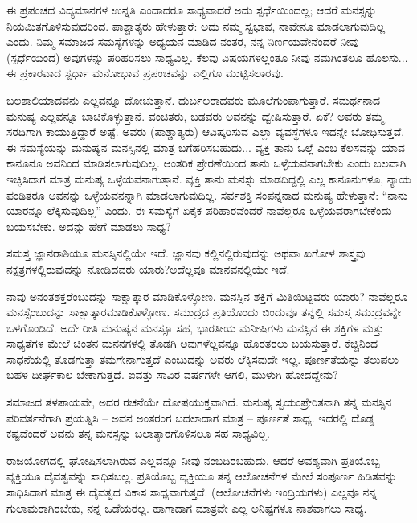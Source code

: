 \newpage

ಈ ಪ್ರಪಂಚದ ವಿದ್ಯಮಾನಗಳ ಉನ್ನತಿ ಎಂದಾದರೂ ಸಾಧ್ಯವಾದರೆ ಅದು ಸ್ಪರ್ಧೆಯಿಂದಲ್ಲ; ಆದರೆ ಮನಸ್ಸನ್ನು ನಿಯಮಿತಗೊಳಿಸುವುದರಿಂದ. ಪಾಶ್ಚಾತ್ಯರು ಹೇಳುತ್ತಾರೆ: ಅದು ನಮ್ಮ ಸ್ವಭಾವ, ನಾವೇನೂ ಮಾಡಲಾಗುವುದಿಲ್ಲ ಎಂದು. ನಿಮ್ಮ ಸಮಾಜದ ಸಮಸ್ಯೆಗಳನ್ನು ಅಧ್ಯಯನ ಮಾಡಿದ ನಂತರ, ನನ್ನ ನಿರ್ಣಯವೇನೆಂದರೆ ನೀವು (ಸ್ಪರ್ಧೆಯಿಂದ) ಅವುಗಳನ್ನು ಪರಿಹರಿಸಲು ಸಾಧ್ಯವಿಲ್ಲ. ಕೆಲವು ವಿಷಯಗಳಲ್ಲಂತೂ ನೀವು ನಮಗಿಂತಲೂ ಹೊಲಸು... ಈ ಪ್ರಕಾರವಾದ ಸ್ಪರ್ಧಾ ಮನೋಭಾವ ಪ್ರಪಂಚವನ್ನು ಎಲ್ಲಿಗೂ ಮುಟ್ಟಿಸಲಾರವು.

\vskip 1.5pt

ಬಲಶಾಲಿಯಾದವನು ಎಲ್ಲವನ್ನೂ ದೋಚುತ್ತಾನೆ. ದುರ್ಬಲರಾದವರು ಮೂಲೆಗುಂಪಾಗುತ್ತಾರೆ. ಸಮರ್ಥನಾದ ಮನುಷ್ಯ ಎಲ್ಲವನ್ನೂ ಬಾಚಿಕೊಳ್ಳುತ್ತಾನೆ. ವಂಚಿತರು, ಬಡವರು ಅವನನ್ನು ದ್ವೇಷಿಸುತ್ತಾರೆ. ಏಕೆ? ಅವರು ತಮ್ಮ ಸರದಿಗಾಗಿ ಕಾಯುತ್ತಿದ್ದಾರೆ ಅಷ್ಟೆ. ಅವರು (ಪಾಶ್ಚಾತ್ಯರು) ಆವಿಷ್ಕರಿಸುವ ಎಲ್ಲಾ ವ್ಯವಸ್ಥೆಗಳೂ ಇದನ್ನೇ ಬೋಧಿಸುತ್ತವೆ. ಈ ಸಮಸ್ಯೆಯನ್ನು ಮನುಷ್ಯನ ಮನಸ್ಸಿನಲ್ಲಿ ಮಾತ್ರ ಬಗೆಹರಿಸಬಹುದು... ವ್ಯಕ್ತಿ ತಾನು ಒಲ್ಲೆ ಎಂಬ ಕೆಲಸವನ್ನು ಯಾವ ಕಾನೂನೂ ಅವನಿಂದ ಮಾಡಿಸಲಾಗುವುದಿಲ್ಲ. ಆಂತರಿಕ ಪ್ರೇರಣೆಯಿಂದ ತಾನು ಒಳ್ಳೆಯವನಾಗಬೇಕು ಎಂದು ಬಲವಾಗಿ ಇಚ್ಚಿಸಿದಾಗ ಮಾತ್ರ ಮನುಷ್ಯ ಒಳ್ಳೆಯವನಾಗುತ್ತಾನೆ. ವ್ಯಕ್ತಿ ತಾನು ಮನಸ್ಸು ಮಾಡದಿದ್ದಲ್ಲಿ ಎಲ್ಲ ಕಾನೂನುಗಳೂ, ನ್ಯಾಯ ಪಂಡಿತರೂ ಅವನನ್ನು ಒಳ್ಳೆಯವನನ್ನಾಗಿ ಮಾಡಲಾಗುವುದಿಲ್ಲ. ಸರ್ವಶಕ್ತಿ ಸಂಪನ್ನನಾದ ಮನುಷ್ಯ ಹೇಳುತ್ತಾನೆ: “ನಾನು ಯಾರನ್ನೂ ಲೆಕ್ಕಿಸುವುದಿಲ್ಲ” ಎಂದು. ಈ ಸಮಸ್ಯೆಗೆ ಏಕೈಕ ಪರಿಹಾರವೆಂದರೆ ನಾವೆಲ್ಲರೂ ಒಳ್ಳೆಯವರಾಗಬೇಕೆಂದು ಬಯಸಬೇಕು. ಅದನ್ನು ಹೇಗೆ ಮಾಡಲು ಸಾಧ್ಯ?

\vskip 1.5pt

ಸಮಸ್ತ ಜ್ಞಾನರಾಶಿಯೂ ಮನಸ್ಸಿನಲ್ಲಿಯೇ ಇದೆ. ಜ್ಞಾನವು ಕಲ್ಲಿನಲ್ಲಿರುವುದನ್ನು ಅಥವಾ ಖಗೋಳ ಶಾಸ್ತ್ರವು ನಕ್ಷತ್ರಗಳಲ್ಲಿರುವುದನ್ನು ನೋಡಿದವರು ಯಾರು?\break ಅದೆಲ್ಲವೂ ಮಾನವನಲ್ಲಿಯೇ ಇದೆ.

\vskip 1.5pt

ನಾವು ಅನಂತಶಕ್ತರೆಂಬುದನ್ನು ಸಾಕ್ಷಾತ್ಕಾರ ಮಾಡಿಕೊಳ್ಳೋಣ. ಮನಸ್ಸಿನ ಶಕ್ತಿಗೆ ಮಿತಿಯಿಟ್ಟವರು ಯಾರು? ನಾವೆಲ್ಲರೂ ಮನಸ್ಸೆಂಬುದನ್ನು ಸಾಕ್ಷಾತ್ಕಾರ\break ಮಾಡಿಕೊಳ್ಳೋಣ. ಸಮುದ್ರದ ಪ್ರತಿಯೊಂದು ಬಿಂದುವೂ ತನ್ನಲ್ಲಿ ಸಮಸ್ತ ಸಮುದ್ರವನ್ನೇ ಒಳಗೊಂಡಿದೆ. ಅದೇ ರೀತಿ ಮನುಷ್ಯನ ಮನಸ್ಸೂ ಸಹ, ಭಾರತೀಯ ಮನೀಷಿಗಳು ಮನಸ್ಸಿನ ಈ ಶಕ್ತಿಗಳ ಮತ್ತು ಸಾಧ್ಯತೆಗಳ ಮೇಲೆ ಚಿಂತನ ಮನನಗಳಲ್ಲಿ ತೊಡಗಿ ಅವುಗಳೆಲ್ಲವನ್ನೂ ಹೊರತರಲು ಬಯಸುತ್ತಾರೆ. ಕೆಚ್ಚಿನಿಂದ ಸಾಧನೆಯಲ್ಲಿ ತೊಡಗುತ್ತಾ ತಮಗೇನಾಗುತ್ತದೆ ಎಂಬುದನ್ನು ಅವರು ಲೆಕ್ಕಿಸವುದೇ ಇಲ್ಲ. ಪೂರ್ಣತೆಯನ್ನು ತಲುಪಲು ಬಹಳ ದೀರ್ಘಕಾಲ ಬೇಕಾಗುತ್ತದೆ. ಐವತ್ತು ಸಾವಿರ ವರ್ಷಗಳೇ ಆಗಲಿ, ಮುಳುಗಿ ಹೋದದ್ದೇನು?

\newpage

ಸಮಾಜದ ತಳಪಾಯವೇ, ಅದರ ರಚನೆಯೇ ದೋಷಯುಕ್ತವಾಗಿದೆ. ಮನುಷ್ಯ ಸ್ವಯಂಪ್ರೇರಿತನಾಗಿ ತನ್ನ ಮನಸ್ಸಿನ ಪರಿವರ್ತನೆಗಾಗಿ ಪ್ರಯತ್ನಿಸಿ – ಅವನ ಅಂತರಂಗ ಬದಲಾದಾಗ ಮಾತ್ರ – ಪೂರ್ಣತೆ ಸಾಧ್ಯ. ಇದರಲ್ಲಿ ದೊಡ್ಡ ಕಷ್ಟವೆಂದರೆ ಅವನು ತನ್ನ ಮನಸ್ಸನ್ನು ಬಲಾತ್ಕಾರಗೊಳಿಸಲೂ ಸಹ ಸಾಧ್ಯವಿಲ್ಲ.

\vskip 1.5pt

ರಾಜಯೋಗದಲ್ಲಿ ಘೋಷಿಸಲಾಗಿರುವ ಎಲ್ಲವನ್ನೂ ನೀವು ನಂಬದಿರಬಹುದು. ಆದರೆ ಅವಶ್ಯವಾಗಿ ಪ್ರತಿಯೊಬ್ಬ ವ್ಯಕ್ತಿಯೂ ದೈವತ್ವವನ್ನು ಸಾಧಿಸಬಲ್ಲ. ಪ್ರತಿಯೊಬ್ಬ ವ್ಯಕ್ತಿಯೂ ತನ್ನ ಆಲೋಚನೆಗಳ ಮೇಲೆ ಸಂಪೂರ್ಣ ಹಿಡಿತವನ್ನು ಸಾಧಿಸಿದಾಗ ಮಾತ್ರ ಈ ದೈವತ್ವದ ವಿಕಾಸ ಸಾಧ್ಯವಾಗುತ್ತದೆ. (ಆಲೋಚನೆಗಳು ಇಂದ್ರಿಯಗಳು) ಎಲ್ಲವೂ ನನ್ನ ಗುಲಾಮರಾಗಿರಬೇಕು, ನನ್ನ ಒಡೆಯರಲ್ಲ. ಹಾಗಾದಾಗ ಮಾತ್ರವೇ ಎಲ್ಲ ಅನಿಷ್ಟಗಳೂ ನಾಶವಾಗಲು ಸಾಧ್ಯ.

